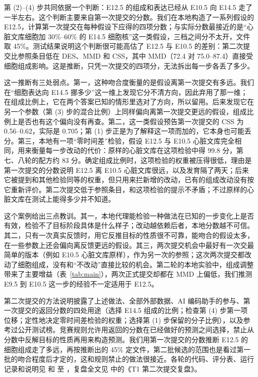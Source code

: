 \documentclass[UTF8,zihao=-4,fontset=none,a4paper]{ctexart}
\begin{document}
第 (2)--(4) 步共同依据一个判断：E12.5 的组成和表达已经从 E10.5 向 E14.5 走了一半左右。这个判断主要来自第一次提交的分数。我们在本地构造了一系列假设的 E12.5，计算第一次提交在每种假设下应得的四项分数；与实际分数最接近的是“心脏文库细胞加 30\%--60\% 的 E14.5 细胞核”这一类假设，三档之间分不太开，文件取 45\%。测试结果说明这个判断很可能高估了 E12.5 与 E10.5 的差别：第二次提交比参照条目低在 DES、MMD 和 CSS，其中 MMD（72.4 对 75.0--87.4）直接受细胞组成影响。这是推断，只凭一次提交的四项分，无法拆出每一步各丢了多少。

这一推断有三处弱点。第一，这种吻合度衡量的是假设离第一次提交有多远。我们在“细胞表达向 E14.5 挪多少”这一维上发现它分不清方向，因此弃用了那一维；在组成比例上，它在两个答案已知的情形里选对了方向，所以留用。后来发现它在另一个参数（第 (3) 步的混合比例）上同样偏向离第一次提交更远的假设，组成比例上是否也有这个偏向没有再查。第二，这一类假设预告第一次提交的 CSS 为 0.56--0.62，实际是 0.705；第 (1) 步正是为了解释这一项而加的，它本身也可能丢分。第三，本地有一项“零时间差”检验，假设 E12.5 与 E10.5 心脏文库完全相同，用来衡量每一步改动的代价：原样的心脏文库在这项检验中得 99.8 分，第七、八轮的配方约 83 分。确定组成比例时，这项检验的权重被压得很低，理由是第一次提交的分数说明 E12.5 离 E10.5 心脏文库很远，以及发育隔了两天；后来它被提到和其他检验同等的权重，但只用来拦新增的改动，已有的组成改动没有按它重新评价。第二次提交低于参照条目，和这项检验的提示不矛盾；不过原样的心脏文库在测试上能得多少并不知道。

这个案例给出三点教训。其一，本地代理能检验一种做法在已知的一步变化上是否有效，检验不了目标阶段具体是什么样子；改动越依赖后者，本地分数越不可信。其二，只有一次真实反馈时，用它反推目标的性质很不可靠，能吻合的假设太多，在一些参数上还会偏向离反馈更远的假设。其三，两次提交机会中最好有一次交最简单的版本（例如 E10.5 心脏文库原样），作为另一次的参照；这次两次提交都改动了细胞组成，没有和“不改动”直接比较的机会。第二轮的本地实验中，组成调整带来了主要增益（表~\ref{tab:main}），两次正式提交却都在 MMD 上偏低，我们推测 E9.5 到 E10.5 这一步的经验不一定适用于 E12.5。

第二次提交的方法说明披露了上述做法、全部外部数据、AI 编码助手的参与、第一次提交的返回分数的四处用途（选择 E14.5 组成的比例；检查第 (4) 步第一项位移；定性地决定零时间差检验的权重；选择第 (1) 步保留的分子比例），以及参考过公开测试榜。竞赛规则允许用返回的分数在已经做好的预测之间选择，禁止从分数中反解目标的性质再用来构造预测\cite{rules}。我们用第一次提交的分数推断 E12.5 的细胞组成走了多远，再按推断出的 45\% 定文件，第二批候选的范围也是看过第一批的吻合程度后才定的，这和规则禁止的做法很接近。各轮的代码、评分表、运行记录和说明见  和  至 ，复盘全文见  中的《T1 第二次提交复盘》。
\end{document}
